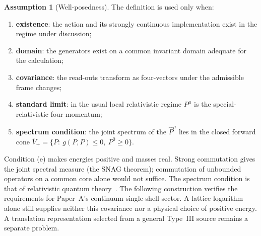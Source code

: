 \documentclass[12pt,a4paper]{article}
\theoremstyle{definition}
\newtheorem{assumption}[theorem]{Assumption}
\theoremstyle{remark}
\newcommand{\tightlist}{%
  \setlength{\itemsep}{0pt}\setlength{\parskip}{0pt}}
\begin{document}
\begin{assumption}[Well-posedness]
\label{ass:wellposed}
The definition is used only when:
\begin{enumerate}[label=(\alph*), leftmargin=*]
\tightlist
\item \textbf{existence}: the action and its strongly continuous implementation exist in the regime under discussion;
\item \textbf{domain}: the generators exist on a common invariant domain adequate for the calculation;
\item \textbf{covariance}: the read-outs transform as four-vectors under the admissible frame changes;
\item \textbf{standard limit}: in the usual local relativistic regime $P^\mu$ is the special-relativistic four-momentum;
\item \textbf{spectrum condition}: the joint spectrum of the $\hat P^\mu$ lies in the closed forward cone $\overline V_+=\{P:\ g(P,P)\le0,\ P^0\ge0\}$.
\end{enumerate}
\end{assumption}

Condition (e) makes energies positive and masses real. Strong commutation gives the joint spectral measure (the SNAG theorem); commutation of unbounded operators on a common core alone would not suffice. The spectrum condition is that of relativistic quantum theory~\cite{Haag1996}. The following construction verifies the requirements for Paper~A's continuum single-shell sector. A lattice logarithm alone still supplies neither this covariance nor a physical choice of positive energy. A translation representation selected from a general Type~III source remains a separate problem.
\end{document}
